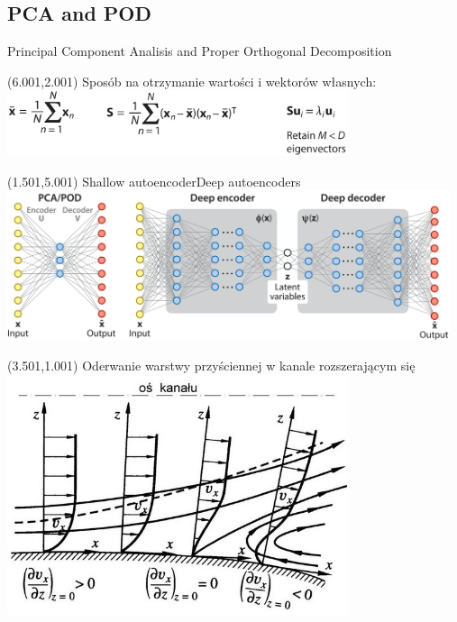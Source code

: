 \documentclass[aspectratio=169]{beamer}
\begin{document}
	\subsection{PCA and POD}
	\begin{frame}{Principal Component Analisis and Proper Orthogonal Decomposition}
		\begin{textblock}{13}(6.001,2.001)
			Sposób na otrzymanie wartości i wektorów własnych:
			\includegraphics[width=10cm]{imgs/PCAandPODequation.png}
		\end{textblock}
		\begin{textblock}{13}(1.501,5.001)
			Shallow autoencoder\qquad \qquad \qquad \qquad Deep autoencoders
			\includegraphics[width=13cm]{imgs/PCAandPOD.png}
		\end{textblock}
	\end{frame}


\begin{frame}
	\begin{textblock}{13}(3.501,1.001)
		Oderwanie warstwy przyściennej w kanale rozszerającym się
		\includegraphics[width=10cm]{imgs/oderwanie.png}
	\end{textblock}
\end{frame}
\end{document}

